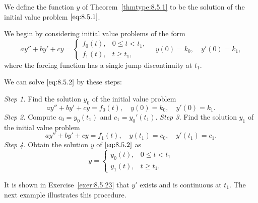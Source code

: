 \documentclass{ximera}
\begin{document}
We define the function $y$  of Theorem~\ref{thmtype:8.5.1}  to be the
solution of the initial value problem $\eqref{eq:8.5.1}$.

We begin by considering initial value problems of the form
\begin{equation}\label{eq:8.5.2}
ay''+by'+cy=\left\{\begin{array}{cl} f_0(t),&0\leq
t<t_1,\\f_1(t),&t\geq t_1,
\end{array}\right.\quad y(0)=k_0,\quad y'(0)=k_1,
\end{equation}
where the forcing function has a single jump discontinuity at $t_1$.

We can solve $\eqref{eq:8.5.2}$ by these steps:
\begin{procedure}\label{proc:forcingfunctdisc}

\textit{Step 1.} Find the solution $y_0$ of  the initial value problem
$$
ay''+by'+cy=f_0(t), \quad  y(0)=k_0,\quad y'(0)=k_1.
$$
\textit{Step 2.} Compute $c_0=y_0(t_1)$ and $c_1=y_0'(t_1)$.
\textit{Step 3.} Find the solution $y_1$ of  the initial value problem
$$
ay''+by'+cy=f_1(t), \quad  y(t_1)=c_0,\quad y'(t_1)=c_1.
$$
\textit{Step 4.} Obtain the solution $y$ of  $\eqref{eq:8.5.2}$ as
$$
y=\left\{\begin{array}{cl} y_0(t),&0\leq t<t_1\\y_1(t),&t\geq t_1.
\end{array}\right.
$$
\end{procedure}


It is shown  in  Exercise~\ref{exer:8.5.23} 
that $y'$  exists and is
continuous at $t_1$. The next example illustrates this procedure.
\end{document}
